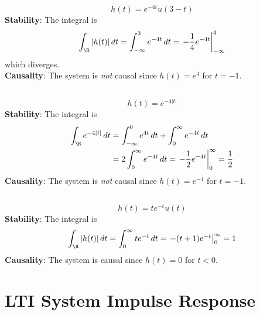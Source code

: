 \documentclass{article}
\begin{document}
\subsection{}

\begin{equation}
    h(t) = e^{-4t} u(3 - t)
\end{equation}
\textbf{Stability}: The integral is
\begin{equation}
    \int_{\R} |h(t)| \, dt = \int_{-\infty}^3 e^{-4t} \, dt = \left.-\frac{1}{4} e^{-4t}\right|_{-\infty}^3
\end{equation}
which diverges. \\
\textbf{Causality}: The system is \emph{not} causal since \(h(t) = e^4\) for \(t = -1\).

\subsection{}

\begin{equation}
    h(t) = e^{-4|t|}
\end{equation}
\textbf{Stability}: The integral is
\begin{align}
    \int_{\R} e^{-4|t|} \, dt &= \int_{-\infty}^0 e^{4t} \, dt + \int_0^\infty e^{-4t} \, dt \\
    &= 2 \int_0^\infty e^{-4t} \, dt = \left.-\frac{1}{2} e^{-4t}\right|_0^\infty = \frac{1}{2}
\end{align}
\textbf{Causality}: The system is \emph{not} causal since \(h(t) = e^{-4}\) for \(t = -1\).

\subsection{}

\begin{equation}
    h(t) = t e^{-t} u(t)
\end{equation}
\textbf{Stability}: The integral is
\begin{align}
    \int_{\R} |h(t)| \, dt = \int_0^\infty t e^{-t} \, dt = \left.-(t + 1) e^{-t}\right|_0^\infty = 1
\end{align}
\textbf{Causality}: The system is causal since \(h(t) = 0\) for \(t < 0\).

\section{LTI System Impulse Response}
\end{document}

